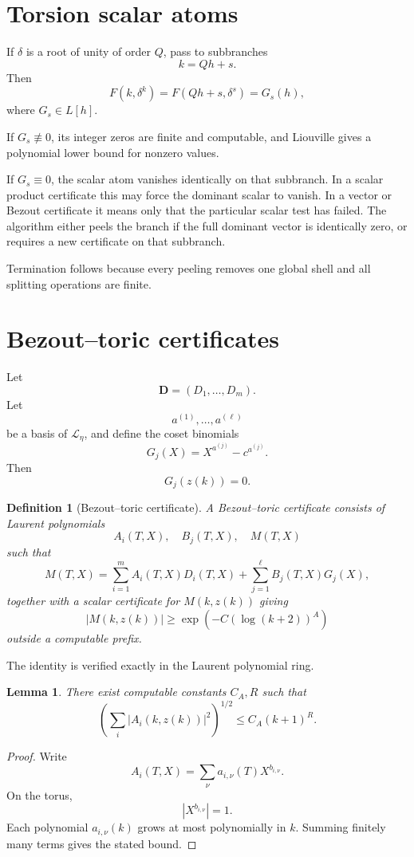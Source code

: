 \documentclass[11pt]{article}
\newtheorem{lemma}[theorem]{Lemma}
\newtheorem{definition}[theorem]{Definition}
\begin{document}
\section{Torsion scalar atoms}

If \(\delta\) is a root of unity of order \(Q\), pass to subbranches
\[
k=Qh+s.
\]
Then
\[
F(k,\delta^k)=F(Qh+s,\delta^s)=G_s(h),
\]
where \(G_s\in L[h]\).

If \(G_s\not\equiv0\), its integer zeros are finite and computable, and Liouville gives a polynomial lower bound for nonzero values.

If \(G_s\equiv0\), the scalar atom vanishes identically on that subbranch. In a scalar product certificate this may force the dominant scalar to vanish. In a vector or Bezout certificate it means only that the particular scalar test has failed. The algorithm either peels the branch if the full dominant vector is identically zero, or requires a new certificate on that subbranch.

Termination follows because every peeling removes one global shell and all splitting operations are finite.

\section{Bezout--toric certificates}

Let
\[
\mathbf D=(D_1,\ldots,D_m).
\]
Let
\[
a^{(1)},\ldots,a^{(\ell)}
\]
be a basis of \(\mathcal L_\eta\), and define the coset binomials
\[
G_j(X)=X^{a^{(j)}}-c^{a^{(j)}}.
\]
Then
\[
G_j(z(k))=0.
\]

\begin{definition}[Bezout--toric certificate]
A Bezout--toric certificate consists of Laurent polynomials
\[
A_i(T,X),\quad B_j(T,X),\quad M(T,X)
\]
such that
\[
M(T,X)=\sum_{i=1}^m A_i(T,X)D_i(T,X)+\sum_{j=1}^\ell B_j(T,X)G_j(X),
\]
together with a scalar certificate for \(M(k,z(k))\) giving
\[
|M(k,z(k))|\ge \exp(-C(\log(k+2))^A)
\]
outside a computable prefix.
\end{definition}

The identity is verified exactly in the Laurent polynomial ring.

\begin{lemma}
There exist computable constants \(C_A,R\) such that
\[
\left(\sum_i|A_i(k,z(k))|^2\right)^{1/2}
\le C_A(k+1)^R.
\]
\end{lemma}

\begin{proof}
Write
\[
A_i(T,X)=\sum_\nu a_{i,\nu}(T)X^{b_{i,\nu}}.
\]
On the torus,
\[
|X^{b_{i,\nu}}|=1.
\]
Each polynomial \(a_{i,\nu}(k)\) grows at most polynomially in \(k\). Summing finitely many terms gives the stated bound.
\end{proof}
\end{document}
